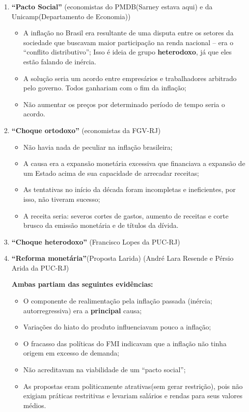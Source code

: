 \documentclass[a4paper,12pt]{article}[abntex2]
\begin{document}
\begin{enumerate}
    \item \textbf{``Pacto Social''} (economistas do PMDB(Sarney estava aqui) e da Unicamp(Departamento de Economia))
    \begin{itemize}
        \item A inflação no Brasil era resultante de uma disputa entre os setores da sociedade que buscavam maior participação na renda nacional – era o ``conflito distributivo''; Isso é ideia de grupo \textbf{heterodoxo}, já que eles estão falando de inércia.
        \item A solução seria um acordo entre empresários e trabalhadores arbitrado pelo governo. Todos ganhariam com o fim da inflação;
        \item Não aumentar os preços por determinado período de tempo seria o acordo.
    \end{itemize}
    
    \item \textbf{``Choque ortodoxo''} (economistas da FGV-RJ)
    \begin{itemize}
        \item Não havia nada de peculiar na inflação brasileira;
        \item A causa era a expansão monetária excessiva que financiava a expansão de um Estado acima de sua capacidade de arrecadar receitas;
        \item As tentativas no início da década foram incompletas e ineficientes, por isso, não tiveram sucesso;
        \item A receita seria: severos cortes de gastos, aumento de receitas e corte brusco da emissão monetária e de títulos da dívida.
    \end{itemize}

    \item \textbf{``Choque heterodoxo''} (Francisco Lopes da PUC-RJ)

    \item \textbf{``Reforma monetária''}(Proposta Larida) (André Lara Resende e Pérsio Arida da PUC-RJ)
    
    \textbf{Ambas partiam das seguintes evidências:}
    \begin{itemize}
        \item O componente de realimentação pela inflação passada (inércia; autorregressiva) era a \textbf{principal} causa;
        \item Variações do hiato do produto influenciavam pouco a inflação;
        \item O fracasso das políticas do FMI indicavam que a inflação não tinha origem em excesso de demanda;
        \item Não acreditavam na viabilidade de um ``pacto social'';
        \item As propostas eram politicamente atrativas(sem gerar restrição), pois não exigiam práticas restritivas e levariam salários e rendas para seus valores médios.
    \end{itemize}
\end{enumerate}
\end{document}
